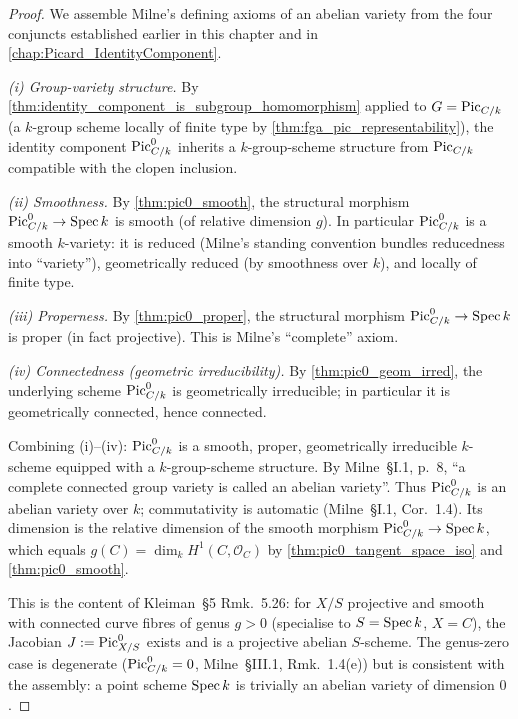 \begin{proof}
  We assemble Milne's defining axioms of an abelian variety from the
  four conjuncts established earlier in this chapter and in
  \cref{chap:Picard_IdentityComponent}.

  \emph{(i) Group-variety structure.} By
  \cref{thm:identity_component_is_subgroup_homomorphism} applied to
  \(G = \operatorname{Pic}_{C/k}\) (a \(k\)-group scheme locally of finite type by
  \cref{thm:fga_pic_representability}), the identity component
  \(\operatorname{Pic}^0_{C/k}\) inherits a \(k\)-group-scheme structure from
  \(\operatorname{Pic}_{C/k}\) compatible with the clopen inclusion.

  \emph{(ii) Smoothness.} By \cref{thm:pic0_smooth}, the structural
  morphism \(\operatorname{Pic}^0_{C/k} \to \operatorname{Spec} k\) is smooth (of relative
  dimension \(g\)). In particular \(\operatorname{Pic}^0_{C/k}\) is a smooth
  \(k\)-variety: it is reduced (Milne's standing convention bundles
  reducedness into ``variety''), geometrically reduced (by
  smoothness over \(k\)), and locally of finite type.

  \emph{(iii) Properness.} By \cref{thm:pic0_proper}, the structural
  morphism \(\operatorname{Pic}^0_{C/k} \to \operatorname{Spec} k\) is proper (in fact
  projective). This is Milne's ``complete'' axiom.

  \emph{(iv) Connectedness (geometric irreducibility).} By
  \cref{thm:pic0_geom_irred}, the underlying scheme
  \(\operatorname{Pic}^0_{C/k}\) is geometrically irreducible; in particular it is
  geometrically connected, hence connected.

  Combining (i)--(iv): \(\operatorname{Pic}^0_{C/k}\) is a smooth, proper,
  geometrically irreducible \(k\)-scheme equipped with a
  \(k\)-group-scheme structure. By Milne~\S I.1, p.~8, ``a complete
  connected group variety is called an abelian variety''. Thus
  \(\operatorname{Pic}^0_{C/k}\) is an abelian variety over \(k\); commutativity is
  automatic (Milne~\S I.1, Cor.~1.4). Its dimension is the relative
  dimension of the smooth morphism \(\operatorname{Pic}^0_{C/k} \to \operatorname{Spec} k\),
  which equals \(g(C) = \dim_k H^1(C, \mathcal{O}_C)\) by
  \cref{thm:pic0_tangent_space_iso} and \cref{thm:pic0_smooth}.

  This is the content of Kleiman~\S 5 Rmk.~5.26: for \(X/S\)
  projective and smooth with connected curve fibres of genus
  \(g > 0\) (specialise to \(S = \operatorname{Spec} k\), \(X = C\)), the Jacobian
  \(J := \operatorname{Pic}^0_{X/S}\) exists and is a projective abelian
  \(S\)-scheme. The genus-zero case is degenerate
  (\(\operatorname{Pic}^0_{C/k} = 0\), Milne~\S III.1, Rmk.~1.4(e)) but is
  consistent with the assembly: a point scheme \(\operatorname{Spec} k\) is
  trivially an abelian variety of dimension \(0\).
\end{proof}

